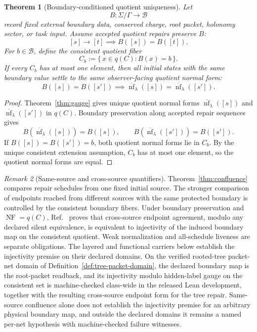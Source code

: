 \documentclass[11pt]{article}
\newtheorem{theorem}{Theorem}[section]
\theoremstyle{remark}
\newtheorem{remark}[theorem]{Remark}
\theoremstyle{plain}
\begin{document}
\begin{theorem}[Boundary-conditioned quotient uniqueness]\label{thm:boundary-conditioned-uniqueness}
Let
\[
B:\Sigma/\Gamma\to\mathcal B
\]
record fixed external boundary data, conserved charge, root packet, holonomy sector, or task
input. Assume accepted quotient repairs preserve \(B\):
\[
[s]\to [t]\implies B([s])=B([t]).
\]
For \(b\in\mathcal B\), define the consistent quotient fiber
\[
C_b:=\{\,x\in q(C):B(x)=b\,\}.
\]
If every \(C_b\) has at most one element, then all initial states with the same boundary value
settle to the same observer-facing quotient normal form:
\[
B([s])=B([s'])\implies
\overline{\operatorname{nf}}_\lambda([s])
=
\overline{\operatorname{nf}}_\lambda([s']).
\]
\end{theorem}

\begin{proof}
Theorem~\ref{thm:gauge} gives unique quotient normal forms
\(\overline{\operatorname{nf}}_\lambda([s])\) and
\(\overline{\operatorname{nf}}_\lambda([s'])\) in \(q(C)\). Boundary preservation along accepted
repair sequences gives
\[
B(\overline{\operatorname{nf}}_\lambda([s]))=B([s]),
\qquad
B(\overline{\operatorname{nf}}_\lambda([s']))=B([s']).
\]
If \(B([s])=B([s'])=b\), both quotient normal forms lie in \(C_b\). By the unique consistent
extension assumption, \(C_b\) has at most one element, so the quotient normal forms are equal.
\end{proof}

\begin{remark}[Same-source and cross-source quantifiers]
Theorem~\ref{thm:confluence} compares repair schedules from one fixed initial source.  The
stronger comparison of endpoints reached from different sources with the same protected boundary
is controlled by the consistent boundary fibers.  Under boundary preservation and
\(\operatorname{NF}=q(C)\), Ref.~\cite{observableNormalForms} proves that cross-source endpoint
agreement, modulo any declared silent equivalence, is equivalent to injectivity of the induced
boundary map on the consistent quotient.  Weak normalization and all-schedule liveness are
separate obligations.  The layered and functional carriers below establish the injectivity premise
on their declared domains.  On the verified rooted-tree packet-net domain of
Definition~\ref{def:tree-packet-domain}, the declared boundary map is the root-packet readback,
and its injectivity modulo hidden-label gauge on the consistent set is machine-checked class-wide
in the released Lean development, together with the resulting cross-source endpoint form for the
tree repair.  Same-source confluence alone does not establish the injectivity premise for an
arbitrary physical boundary map, and outside the declared domains it remains a named per-net
hypothesis with machine-checked failure witnesses.
\end{remark}
\end{document}
